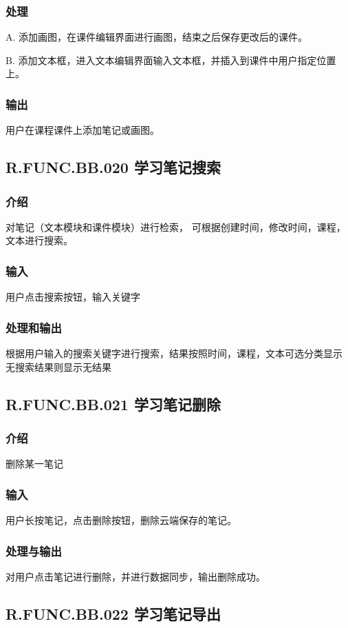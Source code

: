 \begin{enumerate}
    \subsubsection{处理}
	A. 添加画图，在课件编辑界面进行画图，结束之后保存更改后的课件。

	B. 添加文本框，进入文本编辑界面输入文本框，并插入到课件中用户指定位置上。
    \subsubsection{输出}
	用户在课程课件上添加笔记或画图。

 \subsection{R.FUNC.BB.020 学习笔记搜索}
    \subsubsection{介绍}
	对笔记（文本模块和课件模块）进行检索，
可根据创建时间，修改时间，课程，文本进行搜索。
    \subsubsection{输入}
	用户点击搜索按钮，输入关键字
    \subsubsection{处理和输出}
	根据用户输入的搜索关键字进行搜索，结果按照时间，课程，文本可选分类显示
无搜索结果则显示无结果

 \subsection{R.FUNC.BB.021 学习笔记删除}
    \subsubsection{介绍}
	删除某一笔记
    \subsubsection{输入}
	用户长按笔记，点击删除按钮，删除云端保存的笔记。
    \subsubsection{处理与输出}
	对用户点击笔记进行删除，并进行数据同步，输出删除成功。


 \subsection{R.FUNC.BB.022 学习笔记导出}

\end{enumerate}
